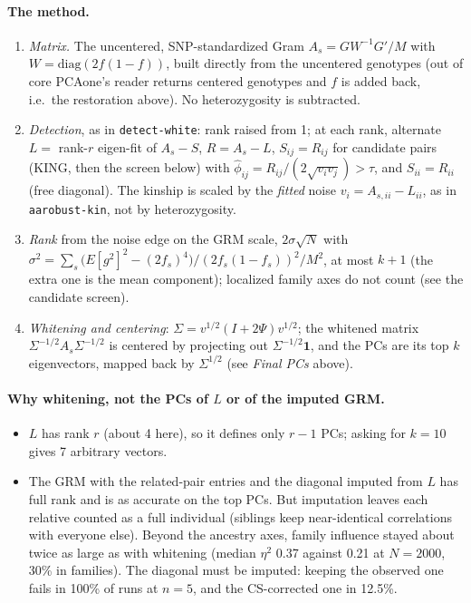 \documentclass[11pt,a4paper]{article}
\begin{document}
\paragraph{The method.}
\begin{enumerate}
  \item \emph{Matrix.} The uncentered, SNP-standardized Gram
    $A_s=GW^{-1}G'/M$ with $W=\mathrm{diag}(2f(1-f))$, built directly from
    the uncentered genotypes (out of core PCAone's reader returns centered
    genotypes and $f$ is added back, i.e.\ the restoration above). No
    heterozygosity is subtracted.
  \item \emph{Detection}, as in \texttt{detect-white}: rank raised from 1;
    at each rank, alternate $L=$ rank-$r$ eigen-fit of $A_s-S$, $R=A_s-L$,
    $S_{ij}=R_{ij}$ for candidate pairs (KING, then the screen below) with
    $\hat\phi_{ij}=R_{ij}/(2\sqrt{v_iv_j})>\tau$, and $S_{ii}=R_{ii}$ (free
    diagonal). The kinship is scaled by the \emph{fitted} noise
    $v_i=A_{s,ii}-L_{ii}$, as in \texttt{aarobust-kin}, not by heterozygosity.
  \item \emph{Rank} from the noise edge on the GRM scale,
    $2\sigma\sqrt N$ with
    $\sigma^2=\sum_s\big(E[g^2]^2-(2f_s)^4\big)/(2f_s(1-f_s))^2/M^2$, at most
    $k+1$ (the extra one is the mean component); localized family axes do
    not count (see the candidate screen).
  \item \emph{Whitening and centering}: $\Sigma=v^{1/2}(I+2\Psi)v^{1/2}$;
    the whitened matrix $\Sigma^{-1/2}A_s\Sigma^{-1/2}$ is centered by
    projecting out $\Sigma^{-1/2}\mathbf 1$, and the PCs are its top $k$
    eigenvectors, mapped back by $\Sigma^{1/2}$ (see \emph{Final PCs} above).
\end{enumerate}

\paragraph{Why whitening, not the PCs of $L$ or of the imputed GRM.}
\begin{itemize}
  \item $L$ has rank $r$ (about 4 here), so it defines only $r-1$ PCs; asking
    for $k=10$ gives 7 arbitrary vectors.
  \item The GRM with the related-pair entries and the diagonal imputed from
    $L$ has full rank and is as accurate on the top PCs. But imputation leaves
    each relative counted as a full individual (siblings keep near-identical
    correlations with everyone else). Beyond the ancestry axes, family
    influence stayed about twice as large as with whitening (median $\eta^2$
    0.37 against 0.21 at $N=2000$, 30\% in families). The diagonal must be
    imputed: keeping the observed one fails in 100\% of runs at $n=5$, and
    the CS-corrected one in 12.5\%.
\end{itemize}
\end{document}
